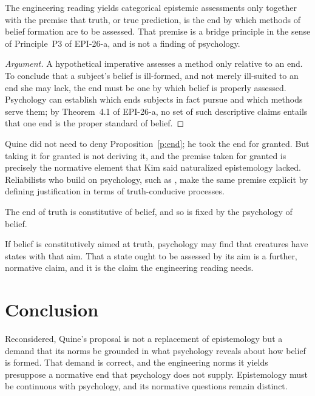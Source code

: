 \documentclass{situationist-preprint}
\begin{document}
\begin{proposition}\label{p:end}
The engineering reading yields categorical epistemic assessments only together with the premise that truth, or true prediction, is the end by which methods of belief formation are to be assessed. That premise is a bridge principle in the sense of Principle~P3 of EPI-26-a, and is not a finding of psychology.
\end{proposition}

\begin{proof}[Argument]
A hypothetical imperative assesses a method only relative to an end. To conclude that a subject's belief is ill-formed, and not merely ill-suited to an end she may lack, the end must be one by which belief is properly assessed. Psychology can establish which ends subjects in fact pursue and which methods serve them; by Theorem~4.1 of EPI-26-a, no set of such descriptive claims entails that one end is the proper standard of belief.
\end{proof}

Quine did not need to deny Proposition~\ref{p:end}; he took the end for granted. But taking it for granted is not deriving it, and the premise taken for granted is precisely the normative element that Kim said naturalized epistemology lacked. Reliabilists who build on psychology, such as \citet{Goldman1986}, make the same premise explicit by defining justification in terms of truth-conducive processes.

\begin{objection}
The end of truth is constitutive of belief, and so is fixed by the psychology of belief.
\end{objection}

\begin{reply}
If belief is constitutively aimed at truth, psychology may find that creatures have states with that aim. That a state ought to be assessed by its aim is a further, normative claim, and it is the claim the engineering reading needs.
\end{reply}

\section{Conclusion}

Reconsidered, Quine's proposal is not a replacement of epistemology but a demand that its norms be grounded in what psychology reveals about how belief is formed. That demand is correct, and the engineering norms it yields presuppose a normative end that psychology does not supply. Epistemology must be continuous with psychology, and its normative questions remain distinct.
\end{document}
